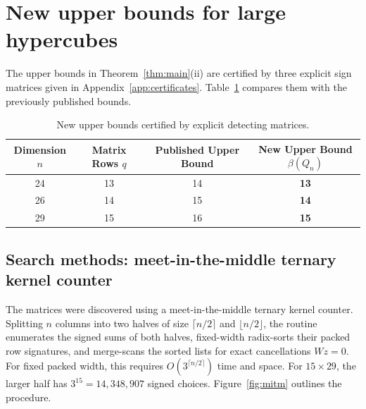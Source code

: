 \documentclass[11pt]{article}
\theoremstyle{plain}
\theoremstyle{definition}
\begin{document}
\section{New upper bounds for large hypercubes}\label{sec:upper-bounds}

The upper bounds in Theorem~\ref{thm:main}(ii) are certified by three explicit sign matrices given in Appendix~\ref{app:certificates}. Table~\ref{tab:bounds} compares them with the previously published bounds.

\begin{table}[t]
\centering
\caption{New upper bounds certified by explicit detecting matrices.}
\label{tab:bounds}
\begin{tabular}{cccc}
\toprule
Dimension $n$ & Matrix Rows $q$ & Published Upper Bound & New Upper Bound $\beta(Q_n)$\\
\midrule
24 & 13 & 14 \cite{hertz2020} & \textbf{13}\\
26 & 14 & 15 \cite{hertz2020} & \textbf{14}\\
29 & 15 & 16 \cite{luye2022} & \textbf{15}\\
\bottomrule
\end{tabular}
\end{table}

\subsection{Search methods: meet-in-the-middle ternary kernel counter}

The matrices were discovered using a meet-in-the-middle ternary kernel counter. Splitting $n$ columns into two halves of size $\lceil n/2 \rceil$ and $\lfloor n/2 \rfloor$, the routine enumerates the signed sums of both halves, fixed-width radix-sorts their packed row signatures, and merge-scans the sorted lists for exact cancellations $Wz=0$. For fixed packed width, this requires $O(3^{\lceil n/2 \rceil})$ time and space. For $15 \times 29$, the larger half has $3^{15} = 14{,}348{,}907$ signed choices. Figure~\ref{fig:mitm} outlines the procedure.
\end{document}

